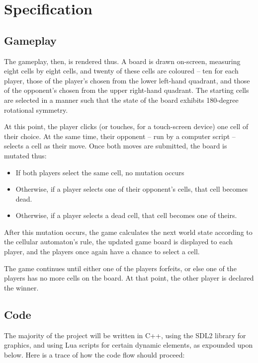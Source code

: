 \documentclass[letterpaper]{article}
\begin{document}
\section{Specification}

\subsection{Gameplay}

The gameplay, then, is rendered thus. A board is drawn on-screen, measuring eight cells by eight cells, and twenty of these cells are coloured -- ten for each player, those of the player's chosen from the lower left-hand quadrant, and those of the opponent's chosen from the upper right-hand quadrant. The starting cells are selected in a manner such that the state of the board exhibits 180-degree rotational symmetry.

At this point, the player clicks (or touches, for a touch-screen device) one cell of their choice. At the same time, their opponent -- run by a computer script -- selects a cell as their move. Once both moves are submitted, the board is mutated thus:

\begin{itemize}
	\item If both players select the same cell, no mutation occurs
	\item Otherwise, if a player selects one of their opponent's cells, that cell becomes dead.
	\item Otherwise, if a player selects a dead cell, that cell becomes one of theirs.
\end{itemize}

After this mutation occurs, the game calculates the next world state according to the cellular automaton's rule, the updated game board is displayed to each player, and the players once again have a chance to select a cell.

The game continues until either one of the players forfeits, or else one of the players has no more cells on the board. At that point, the other player is declared the winner.

\subsection{Code}

The majority of the project will be written in C++, using the SDL2 library for graphics, and using Lua scripts for certain dynamic elements, as expounded upon below. Here is a trace of how the code flow should proceed:
\end{document}
